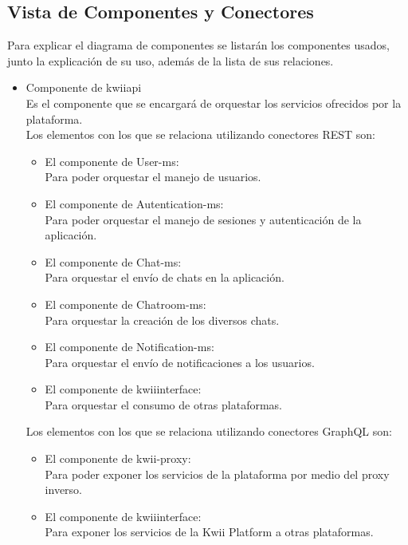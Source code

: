 \subsection{Vista de Componentes y Conectores}
Para explicar el diagrama de componentes se listarán los componentes usados, junto la explicación de su uso, además de la lista de sus relaciones.
\begin{itemize}
    \item Componente de kwii\textunderscore api\\
    Es el componente que se encargará de orquestar los servicios ofrecidos por la plataforma.\\
    Los elementos con los que se relaciona utilizando conectores REST son:
    \begin{itemize}
        \item El componente de User-ms:\\
        Para poder orquestar el manejo de usuarios.
        \item El componente de Autentication-ms:\\
        Para poder orquestar el manejo de sesiones y autenticación de la aplicación.
        \item El componente de Chat-ms:\\
        Para orquestar el envío de chats en la aplicación.
        \item El componente de Chatroom-ms:\\
        Para orquestar la creación de los diversos chats.
        \item El componente de Notification-ms:\\
        Para orquestar el envío de notificaciones a los usuarios.
        \item El componente de kwii\textunderscore interface:\\
        Para orquestar el consumo de otras plataformas.
    \end{itemize}
    Los elementos con los que se relaciona utilizando conectores GraphQL son:
    \begin{itemize}
        \item El componente de kwii-proxy:\\
        Para poder exponer los servicios de la plataforma por medio del proxy inverso.
        \item El componente de kwii\textunderscore interface:\\
        Para exponer los servicios de la Kwii Platform a otras plataformas.
    \end{itemize}

\end{itemize}
